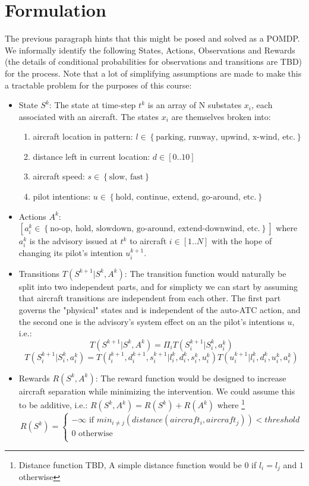 \documentclass[english]{article}
\begin{document}
\section{Formulation}
The previous paragraph hints that this might be posed and solved as a POMDP. We informally identify the following States, Actions, Observations and Rewards (the details of conditional probabilities for observations and transitions are TBD) for the process. Note that a lot of simplifying assumptions are made to make this a tractable problem for the purposes of this course:

\begin{itemize}
\item State $S^k$: The state at time-step $t^k$ is an array of N substates {$x_i$}, each associated with an aircraft. The states $x_i$ are themselves broken into:
\begin{enumerate}
\item aircraft location in pattern: $l \in \left\{\mbox{parking, runway, upwind, x-wind, etc.}\right\}$
\item distance left in current location: $d \in \left[0..10\right]$
\item aircraft speed: $s \in \left\{\mbox{slow, fast}\right\}$
\item pilot intentions: $u \in \left\{\mbox{hold, continue, extend, go-around, etc.}\right\}$ 
\end{enumerate}

\item Actions $A^k$: $[a_i^k \in \left\{\mbox{no-op, hold, slowdown, go-around, extend-downwind, etc.}\right\}]$ where $a_i^k$ is the advisory issued at $t^k$ to aircraft $i\in[1..N]$ with the hope of changing its pilot's intention $u_i^{k+1}$.

\item Transitions $T(S^{k+1} | S^{k}, A^{k})$: The transition function would naturally be split into two independent parts, and for simplicty we can start by assuming that aircraft transitions are independent from each other. The first part governs the "physical" states and is independent of the auto-ATC action, and the second one is the advisory's system effect on an the pilot's intentions $u$, i.e.:
$$T(S^{k+1} | S^{k}, A^{k}) = \Pi_i T(S_i^{k+1} | S_i^{k}, a_i^{k})$$
$$T(S_i^{k+1} | S_i^{k}, a_i^{k}) = T(l_i^{k+1}, d_i^{k+1}, s_i^{k+1} | l_i^{k}, d_i^{k}, s_i^{k}, u_i^{k}) T(u_i^{k+1} | {l_i^k, d_i^k, u_i^k} , a_i^k)$$

\item Rewards $R(S^k, A^k)$: The reward function would be designed to increase aircraft separation while minimizing the intervention. We could assume this to be additive, i.e.:
$R(S^k, A^k) = R(S^k) + R(A^k)$ where \footnote{Distance function TBD, A simple distance function would be $0$ if $l_i = l_j$ and $1$ otherwise}
$$ R(S^k) = 
\begin{cases}
-\infty \mbox{ if } min_{i \neq j}(distance(aircraft_i, aircraft_j)) < threshold\\
0 \mbox{    otherwise}\\
\end{cases}
$$


\end{itemize}
\end{document}

